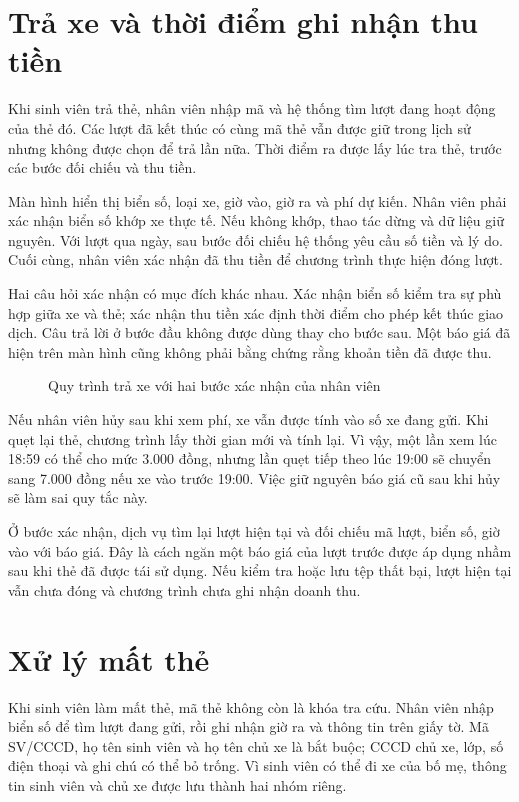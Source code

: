 \section{Trả xe và thời điểm ghi nhận thu tiền}
Khi sinh viên trả thẻ, nhân viên nhập mã và hệ thống tìm lượt đang hoạt động của thẻ đó. Các lượt đã kết thúc có cùng mã thẻ vẫn được giữ trong lịch sử nhưng không được chọn để trả lần nữa. Thời điểm ra được lấy lúc tra thẻ, trước các bước đối chiếu và thu tiền.

Màn hình hiển thị biển số, loại xe, giờ vào, giờ ra và phí dự kiến. Nhân viên phải xác nhận biển số khớp xe thực tế. Nếu không khớp, thao tác dừng và dữ liệu giữ nguyên. Với lượt qua ngày, sau bước đối chiếu hệ thống yêu cầu số tiền và lý do. Cuối cùng, nhân viên xác nhận đã thu tiền để chương trình thực hiện đóng lượt.

Hai câu hỏi xác nhận có mục đích khác nhau. Xác nhận biển số kiểm tra sự phù hợp giữa xe và thẻ; xác nhận thu tiền xác định thời điểm cho phép kết thúc giao dịch. Câu trả lời ở bước đầu không được dùng thay cho bước sau. Một báo giá đã hiện trên màn hình cũng không phải bằng chứng rằng khoản tiền đã được thu.

\begin{figure}[H]
\centering

\caption{Quy trình trả xe với hai bước xác nhận của nhân viên}
\label{fig:checkout}
\end{figure}

Nếu nhân viên hủy sau khi xem phí, xe vẫn được tính vào số xe đang gửi. Khi quẹt lại thẻ, chương trình lấy thời gian mới và tính lại. Vì vậy, một lần xem lúc 18:59 có thể cho mức 3.000 đồng, nhưng lần quẹt tiếp theo lúc 19:00 sẽ chuyển sang 7.000 đồng nếu xe vào trước 19:00. Việc giữ nguyên báo giá cũ sau khi hủy sẽ làm sai quy tắc này.

Ở bước xác nhận, dịch vụ tìm lại lượt hiện tại và đối chiếu mã lượt, biển số, giờ vào với báo giá. Đây là cách ngăn một báo giá của lượt trước được áp dụng nhầm sau khi thẻ đã được tái sử dụng. Nếu kiểm tra hoặc lưu tệp thất bại, lượt hiện tại vẫn chưa đóng và chương trình chưa ghi nhận doanh thu.

\section{Xử lý mất thẻ}
Khi sinh viên làm mất thẻ, mã thẻ không còn là khóa tra cứu. Nhân viên nhập biển số để tìm lượt đang gửi, rồi ghi nhận giờ ra và thông tin trên giấy tờ. Mã SV/CCCD, họ tên sinh viên và họ tên chủ xe là bắt buộc; CCCD chủ xe, lớp, số điện thoại và ghi chú có thể bỏ trống. Vì sinh viên có thể đi xe của bố mẹ, thông tin sinh viên và chủ xe được lưu thành hai nhóm riêng.

